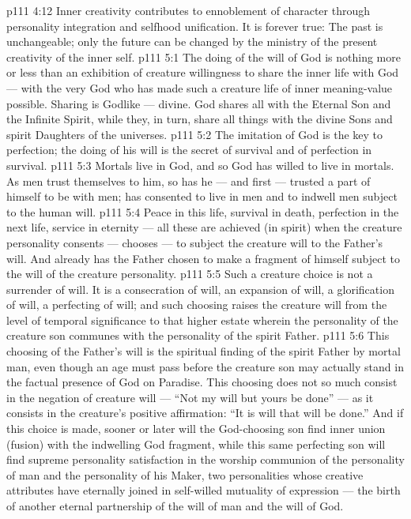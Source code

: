\vs p111 4:12 \pc Inner creativity contributes to ennoblement of character through personality integration and selfhood unification. It is forever true: The past is unchangeable; only the future can be changed by the ministry of the present creativity of the inner self.
\vs p111 5:1 The doing of the will of God is nothing more or less than an exhibition of creature willingness to share the inner life with God --- with the very God who has made such a creature life of inner meaning\hyp{}value possible. Sharing is Godlike --- divine. God shares all with the Eternal Son and the Infinite Spirit, while they, in turn, share all things with the divine Sons and spirit Daughters of the universes.
\vs p111 5:2 The imitation of God is the key to perfection; the doing of his will is the secret of survival and of perfection in survival.
\vs p111 5:3 Mortals live in God, and so God has willed to live in mortals. As men trust themselves to him, so has he --- and first --- trusted a part of himself to be with men; has consented to live in men and to indwell men subject to the human will.
\vs p111 5:4 Peace in this life, survival in death, perfection in the next life, service in eternity --- all these are achieved (in spirit)  when the creature personality consents --- chooses --- to subject the creature will to the Father’s will. And already has the Father chosen to make a fragment of himself subject to the will of the creature personality.
\vs p111 5:5 Such a creature choice is not a surrender of will. It is a consecration of will, an expansion of will, a glorification of will, a perfecting of will; and such choosing raises the creature will from the level of temporal significance to that higher estate wherein the personality of the creature son communes with the personality of the spirit Father.
\vs p111 5:6 This choosing of the Father’s will is the spiritual finding of the spirit Father by mortal man, even though an age must pass before the creature son may actually stand in the factual presence of God on Paradise. This choosing does not so much consist in the negation of creature will --- “Not my will but yours be done” --- as it consists in the creature’s positive affirmation: “It is  will that  will be done.” And if this choice is made, sooner or later will the God\hyp{}choosing son find inner union (fusion) with the indwelling God fragment, while this same perfecting son will find supreme personality satisfaction in the worship communion of the personality of man and the personality of his Maker, two personalities whose creative attributes have eternally joined in self\hyp{}willed mutuality of expression --- the birth of another eternal partnership of the will of man and the will of God.
